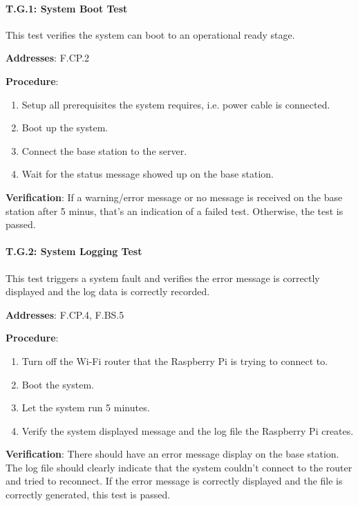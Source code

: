 \paragraph{T.G.1: System Boot Test}

This test verifies the system can boot to an operational ready stage.

\textbf{Addresses}: F.CP.2

\textbf{Procedure}:
\begin{enumerate}[noitemsep]
    \item Setup all prerequisites the system requires, i.e. power cable is connected.
    \item Boot up the system.
    \item Connect the base station to the server.
    \item Wait for the status message showed up on the base station.
\end{enumerate}

\textbf{Verification}: 
If a warning/error message or no message is received on the base station after 5 minus, that's an indication of a failed test. Otherwise, the test is passed.

%

\paragraph{T.G.2: System Logging Test}

This test triggers a system fault and verifies the error message is correctly displayed and the log data is correctly recorded.

\textbf{Addresses}: F.CP.4, F.BS.5

\textbf{Procedure}:
\begin{enumerate}[noitemsep]
    \item Turn off the Wi-Fi router that the Raspberry Pi is trying to connect to.
    \item Boot the system.
    \item Let the system run 5 minutes.
    \item Verify the system displayed message and the log file the Raspberry Pi creates.
\end{enumerate}

\textbf{Verification}: 
There should have an error message display on the base station. The log file should clearly indicate that the system couldn't connect to the router and tried to reconnect. If the error message is correctly displayed and the file is correctly generated, this test is passed.

